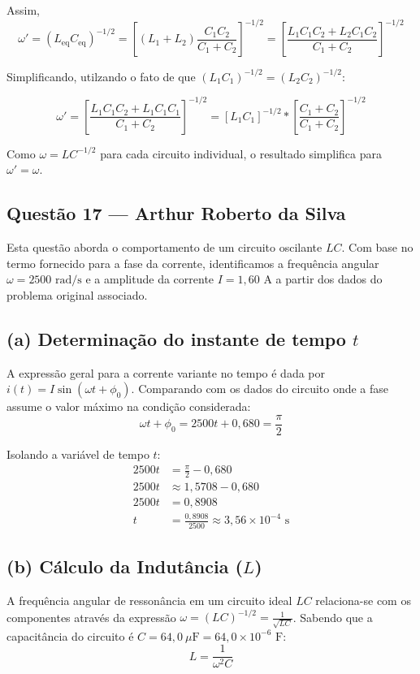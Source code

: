 \documentclass[12pt,a4paper]{article}
\begin{document}
Assim,
\[
\omega' = \left(L_{\mathrm{eq}}C_{\mathrm{eq}}\right)^{-1/2}
= \left[(L_1+L_2)\frac{C_1C_2}{C_1+C_2}\right]^{-1/2}
= \left[\frac{L_1C_1C_2 + L_2C_1C_2}{C_1+C_2}\right]^{-1/2}
\]

Simplificando, utilzando o fato de que $(L_1C_1)^{-1/2} = (L_2C_2)^{-1/2}$:

\[
\omega' = \left[\frac{L_1C_1C_2 + L_1C_1C_1}{C_1+C_2}\right]^{-1/2}
=  \left[{L_1C_1}\right]^{-1/2}*\left[\frac{C_1+C_2}{C_1+C_2}\right]^{-1/2}
\]

Como $\omega = {LC}^{-1/2}$ para cada circuito individual, o resultado simplifica para $\omega'=\omega$.

\subsection{Questão 17 — Arthur Roberto da Silva}
Esta questão aborda o comportamento de um circuito oscilante $LC$. Com base no termo fornecido para a fase da corrente, identificamos a frequência angular $\omega = 2500\text{ rad/s}$ e a amplitude da corrente $I = 1,60\text{ A}$ a partir dos dados do problema original associado.

\subsection*{(a) Determinação do instante de tempo $t$}

A expressão geral para a corrente variante no tempo é dada por $i(t) = I \sin(\omega t + \phi_0)$. Comparando com os dados do circuito onde a fase assume o valor máximo na condição considerada:
\begin{equation*}
\omega t + \phi_0 = 2500t + 0,680 = \frac{\pi}{2}
\end{equation*}

Isolando a variável de tempo $t$:
\begin{align*}
2500t &= \frac{\pi}{2} - 0,680 \\
2500t &\approx 1,5708 - 0,680 \\
2500t &= 0,8908 \\
t &= \frac{0,8908}{2500} \approx 3,56 \times 10^{-4}\text{ s}
\end{align*}

\subsection*{(b) Cálculo da Indutância ($L$)}

A frequência angular de ressonância em um circuito ideal $LC$ relaciona-se com os componentes através da expressão $\omega = (LC)^{-1/2} = \frac{1}{\sqrt{LC}}$. Sabendo que a capacitância do circuito é $C = 64,0\ \mu\text{F} = 64,0 \times 10^{-6}\text{ F}$:
\begin{equation*}
L = \frac{1}{\omega^2 C}
\end{equation*}
\end{document}
